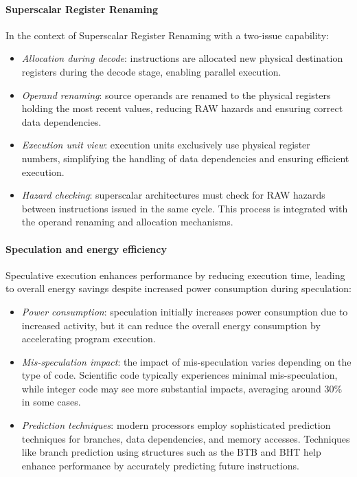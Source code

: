 \paragraph*{Superscalar Register Renaming}
In the context of Superscalar Register Renaming with a two-issue capability:
\begin{itemize}
    \item \textit{Allocation during decode}: instructions are allocated new physical destination registers during the decode stage, enabling parallel execution.
    \item \textit{Operand renaming}: source operands are renamed to the physical registers holding the most recent values, reducing RAW hazards and ensuring correct data dependencies.
    \item \textit{Execution unit view}: execution units exclusively use physical register numbers, simplifying the handling of data dependencies and ensuring efficient execution.
    \item \textit{Hazard checking}: superscalar architectures must check for RAW hazards between instructions issued in the same cycle. 
        This process is integrated with the operand renaming and allocation mechanisms.
\end{itemize}

\paragraph*{Speculation and energy efficiency}
Speculative execution enhances performance by reducing execution time, leading to overall energy savings despite increased power consumption during speculation:
\begin{itemize}
    \item \textit{Power consumption}: speculation initially increases power consumption due to increased activity, but it can reduce the overall energy consumption by accelerating program execution.
    \item \textit{Mis-speculation impact}: the impact of mis-speculation varies depending on the type of code.
        Scientific code typically experiences minimal mis-speculation, while integer code may see more substantial impacts, averaging around 30\% in some cases.
    \item \textit{Prediction techniques}: modern processors employ sophisticated prediction techniques for branches, data dependencies, and memory accesses. 
        Techniques like branch prediction using structures such as the BTB and BHT help enhance performance by accurately predicting future instructions.
\end{itemize}

